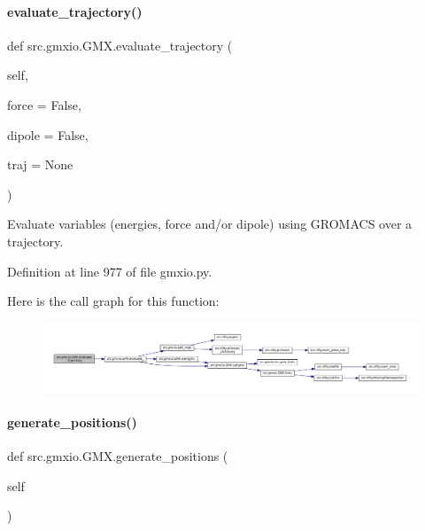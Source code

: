 \paragraph{\texorpdfstring{evaluate\+\_\+trajectory()}{evaluate\_trajectory()}}
{\footnotesize\ttfamily def src.\+gmxio.\+G\+M\+X.\+evaluate\+\_\+trajectory (\begin{DoxyParamCaption}\item[{}]{self,  }\item[{}]{force = {\ttfamily False},  }\item[{}]{dipole = {\ttfamily False},  }\item[{}]{traj = {\ttfamily None} }\end{DoxyParamCaption})}



Evaluate variables (energies, force and/or dipole) using G\+R\+O\+M\+A\+CS over a trajectory. 



Definition at line 977 of file gmxio.\+py.

Here is the call graph for this function\+:
\nopagebreak
\begin{figure}[H]
\begin{center}
\leavevmode
\includegraphics[width=350pt]{classsrc_1_1gmxio_1_1GMX_ab183586fa000692169f9904269add851_cgraph}
\end{center}
\end{figure}
\mbox{\label{classsrc_1_1gmxio_1_1GMX_a414ad54bca72f823dee0cb5239cc8e58}} 
\paragraph{\texorpdfstring{generate\+\_\+positions()}{generate\_positions()}}
{\footnotesize\ttfamily def src.\+gmxio.\+G\+M\+X.\+generate\+\_\+positions (\begin{DoxyParamCaption}\item[{}]{self }\end{DoxyParamCaption})}



